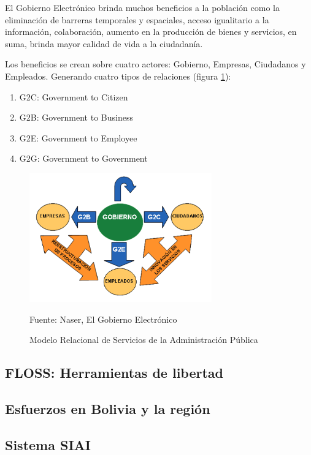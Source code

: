 El Gobierno Electrónico brinda muchos beneficios a la población como la eliminación de barreras temporales y espaciales, acceso igualitario a la información, colaboración, aumento en la producción de bienes y servicios, en suma, brinda mayor calidad de vida a la ciudadanía.

Los beneficios se crean sobre cuatro actores: Gobierno, Empresas, Ciudadanos y Empleados. Generando cuatro tipos de relaciones (figura \ref{fig:g2all}):

\begin{enumerate}
    \item G2C: Government to Citizen
    \item G2B: Government to Business
    \item G2E: Government to Employee
    \item G2G: Government to Government
\end{enumerate}

\begin{figure}[!h]
    \centering
    \includegraphics[width=0.7\textwidth]{assets/g2all}
    \caption{Modelo Relacional de Servicios de la Administración Pública}{Fuente: Naser, El Gobierno Electrónico}
    \label{fig:g2all}
\end{figure}

\subsection{FLOSS: Herramientas de libertad}

\subsection{Esfuerzos en Bolivia y la región}

\subsection{Sistema SIAI}

